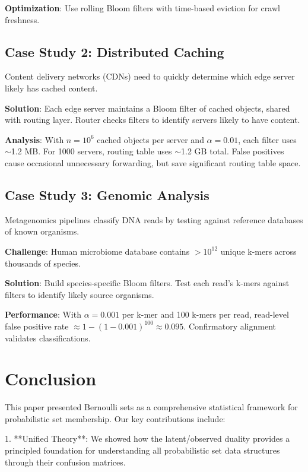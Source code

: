\documentclass[11pt]{article}
\begin{document}
\textbf{Optimization}: Use rolling Bloom filters with time-based eviction for crawl freshness.

\subsection{Case Study 2: Distributed Caching}

Content delivery networks (CDNs) need to quickly determine which edge server likely has cached content.

\textbf{Solution}: Each edge server maintains a Bloom filter of cached objects, shared with routing layer. Router checks filters to identify servers likely to have content.

\textbf{Analysis}: With $n = 10^6$ cached objects per server and $\alpha = 0.01$, each filter uses $\sim$1.2 MB. For 1000 servers, routing table uses $\sim$1.2 GB total. False positives cause occasional unnecessary forwarding, but save significant routing table space.

\subsection{Case Study 3: Genomic Analysis}

Metagenomics pipelines classify DNA reads by testing against reference databases of known organisms.

\textbf{Challenge}: Human microbiome database contains $>10^{12}$ unique k-mers across thousands of species.

\textbf{Solution}: Build species-specific Bloom filters. Test each read's k-mers against filters to identify likely source organisms.

\textbf{Performance}: With $\alpha = 0.001$ per k-mer and 100 k-mers per read, read-level false positive rate $\approx 1 - (1-0.001)^{100} \approx 0.095$. Confirmatory alignment validates classifications.

\section{Conclusion}

This paper presented Bernoulli sets as a comprehensive statistical framework for probabilistic set membership. Our key contributions include:

1. **Unified Theory**: We showed how the latent/observed duality provides a principled foundation for understanding all probabilistic set data structures through their confusion matrices.
\end{document}
